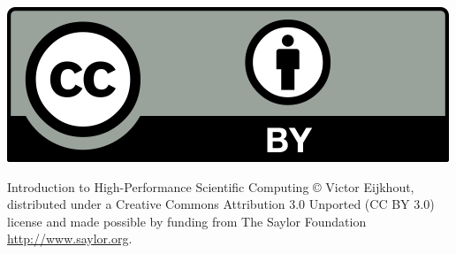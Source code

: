 
\hbox{}\vfill\thispagestyle{empty}

\includegraphics{ccby}

Introduction to High-Performance Scientific Computing \copyright{}
Victor Eijkhout, distributed under a Creative Commons Attribution 3.0
Unported (CC BY 3.0) license and made possible by funding from
The Saylor Foundation \url{http://www.saylor.org}.

\hbox{}\vskip 2in \hbox{}
\pagebreak
